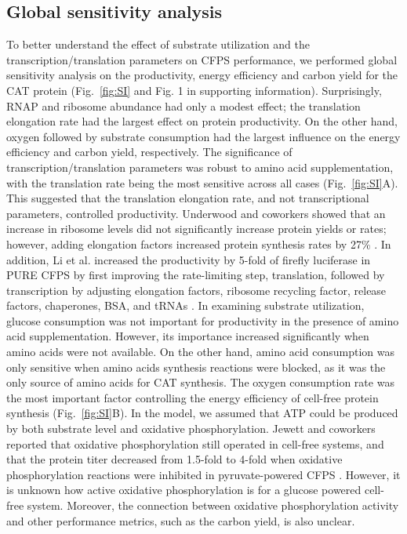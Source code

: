 \documentclass[journal=asbcd6,manuscript=article]{achemso}
\begin{document}


\subsection{Global sensitivity analysis}
To better understand the effect of substrate utilization and the transcription/translation parameters on CFPS performance, we performed global sensitivity analysis on the productivity, energy efficiency and carbon yield for the CAT protein (Fig.~\ref{fig:SI} and Fig. 1 in supporting information).
Surprisingly, RNAP and ribosome abundance had only a modest effect;
the translation elongation rate had the largest effect on protein productivity.
On the other hand, oxygen followed by substrate consumption had the largest influence on the energy efficiency and carbon yield, respectively.
The significance of transcription/translation parameters was robust to amino acid supplementation, with the translation rate being the most sensitive across all cases (Fig.~\ref{fig:SI}A).
This suggested that the translation elongation rate, and not transcriptional parameters, controlled productivity.
Underwood and coworkers showed that an increase in ribosome levels did not significantly increase protein yields or rates; however, adding elongation factors increased protein synthesis rates by 27\% \cite{2005_underwood_biotech}.
In addition, Li et al. increased the productivity by 5-fold of firefly luciferase in PURE CFPS by first improving the rate-limiting step, translation, followed by transcription by adjusting elongation factors, ribosome recycling factor, release factors, chaperones, BSA, and tRNAs \cite{2014_li_PlosOne}.
In examining substrate utilization, glucose consumption was not important for productivity in the presence of amino acid supplementation.
However, its importance increased significantly when amino acids were not available.
On the other hand, amino acid consumption was only sensitive when amino acids synthesis reactions were blocked, as it was the only source of amino acids for CAT synthesis. The oxygen consumption rate was the most important factor controlling the energy efficiency of cell-free protein synthesis (Fig.~\ref{fig:SI}B).
In the model, we assumed that ATP could be produced by both substrate level and oxidative phosphorylation.
Jewett and coworkers reported that oxidative phosphorylation still operated in cell-free systems, and that the protein
titer decreased from 1.5-fold to 4-fold when oxidative phosphorylation reactions were inhibited in pyruvate-powered CFPS \cite{Jewett:2008aa}.
However, it is unknown how active oxidative phosphorylation is for a glucose powered cell-free system.
Moreover, the connection between oxidative phosphorylation activity and other performance metrics, such as the carbon yield, is also unclear.
\end{document}
